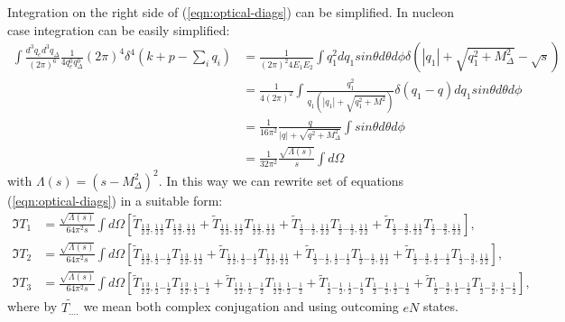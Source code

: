 \documentclass[12pt]{revtex4-1}
\newcommand{\hp}{{\frac{1}{2}}}
\newcommand{\hm}{{-\frac{1}{2}}}
\newcommand{\tp}{{\frac{3}{2}}}
\newcommand{\tm}{{-\frac{3}{2}}}
\begin{document}
	Integration on the right side of (\ref{eqn:optical-diags}) can be simplified.
	In nucleon case integration can be easily simplified:
	\begin{align}
		 \int \frac{d^3 q_e d^3 q_\Delta}{(2 \pi)^6} \frac{1}{4 q^0_e q^0_\Delta}
		(2 \pi)^4 \delta^4 (k + p-\sum_i q_i)
		& =  \frac{1}{(2 \pi)^2 4 E_1 E_2} \int q_1^2 d q_1sin \theta d \theta d \phi
		\delta( |q_1| + \sqrt{q_1^2 + M_\Delta^2} - \sqrt{s} )
		\nonumber
		\\
		& =  \frac{1}{4 (2 \pi)^2} \int \frac{q_1^2}{q_1 (|q_1| + \sqrt{q_1^2 + M^2})}
		\delta( q_1 - q) d q_1sin \theta d \theta d \phi
		\nonumber
		\\
		& =  \frac{1}{16 \pi^2} \frac{q}{|q| + \sqrt{q^2 + M_\Delta^2}}
		\int sin \theta d \theta d \phi
		\nonumber
		\\
		& =  \frac{1}{32 \pi^2} \frac{\sqrt{\Lambda(s)}}{s} \int d \Omega \nonumber
	\end{align}
	with $ \Lambda(s) = ( s - M_\Delta^2 )^2 $.
	In this way we can rewrite set of equations (\ref{eqn:optical-diags})
	in a suitable form:
	\begin{align}
		 \Im T_1 & = \frac{\sqrt{\Lambda(s)}}{64 \pi^2 s} \int d \Omega
		 \left[ \tilde{T}_{\hp \tp, \hp \hp} T_{\hp \tp, \hp \hp}
		  + \tilde{T}_{\hp \hp, \hp \hp} T_{\hp \hp, \hp \hp}
		  + \tilde{T}_{\hp \hm, \hp \hp} T_{\hp \hm, \hp \hp}
		  + \tilde{T}_{\hp \tm, \hp \hp} T_{\hp \tm, \hp \hp}
		 \right],
		 \nonumber
		 \\
		 \Im T_2 & = \frac{\sqrt{\Lambda(s)}}{64 \pi^2 s} \int d \Omega
		 \left[ \tilde{T}_{\hp \tp, \hp \hm} T_{\hp \tp, \hp \hp}
		  + \tilde{T}_{\hp \hp, \hp \hm} T_{\hp \hp, \hp \hp}
		  + \tilde{T}_{\hp \hm, \hp \hm} T_{\hp \hm, \hp \hp}
		  + \tilde{T}_{\hp \tm, \hp \hm} T_{\hp \tm, \hp \hp}
		 \right],
		 \nonumber
		 \\
		 \Im T_3 & = \frac{\sqrt{\Lambda(s)}}{64 \pi^2 s} \int d \Omega
		 \left[ \tilde{T}_{\hp \tp, \hp \hm} T_{\hp \tp, \hp \hm}
		  + \tilde{T}_{\hp \hp, \hp \hm} T_{\hp \hp, \hp \hm}
		  + \tilde{T}_{\hp \hm, \hp \hm} T_{\hp \hm, \hp \hm}
		  + \tilde{T}_{\hp \tm, \hp \hm} T_{\hp \tm, \hp \hm}
		 \right], 
	\end{align}
	where by $\tilde{T_{....}}$ we mean both complex conjugation and using
	outcoming $eN$ states.
\end{document}
